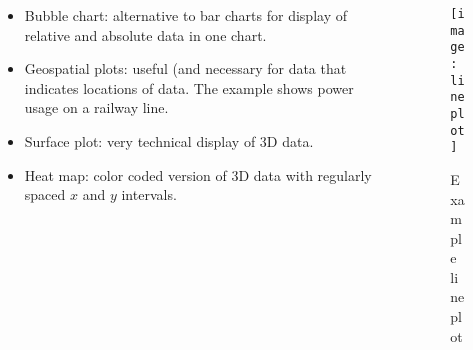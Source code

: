 {\begin{columns}[t]
\begin{column}[T]{6cm}
{\begin{itemize}
		\item Bubble chart: alternative to bar charts for display of relative and absolute data in one chart.
		\item Geospatial plots: useful (and necessary for data that indicates locations of data. The example shows power usage on a railway line.
		\item Surface plot: very technical display of 3D data.
		\item Heat map: color coded version of 3D data with regularly spaced $x$ and $y$ intervals.
     	\end{itemize}
	}
     \end{column}
     \begin{column}[T]{6cm}
       	\begin{center}
				\begin{figure}[htbp]
					\centering
					\texttt{[image: lineplot]}
					\caption{Example line plot}
				\end{figure}
\end{center}
\end{column}
\end{columns}}
